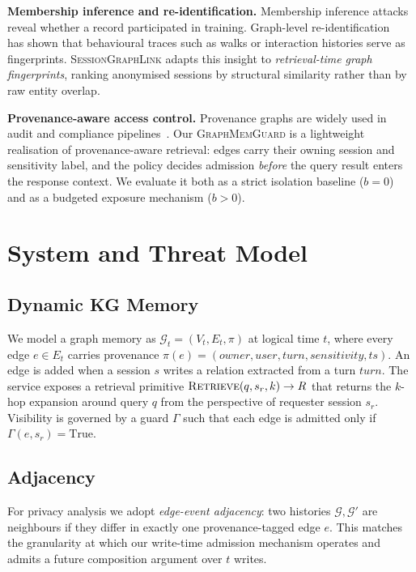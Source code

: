\documentclass[journal,10pt,twocolumn]{IEEEtran}
\begin{document}
\textbf{Membership inference and re-identification.} Membership
inference attacks~\cite{Shokri2017,Salem2019} reveal whether a record
participated in training. Graph-level
re-identification~\cite{Backes2017Walk2friends} has shown that
behavioural traces such as walks or interaction histories serve as
fingerprints. \textsc{SessionGraphLink} adapts this insight to
\emph{retrieval-time graph fingerprints}, ranking anonymised sessions
by structural similarity rather than by raw entity overlap.

\textbf{Provenance-aware access control.} Provenance graphs are widely
used in audit and compliance pipelines~\cite{Pasquier2017}. Our
\textsc{GraphMemGuard} is a lightweight realisation of
provenance-aware retrieval: edges carry their owning session and
sensitivity label, and the policy decides admission \emph{before} the
query result enters the response context. We evaluate it both as a
strict isolation baseline (\(b{=}0\)) and as a budgeted
exposure mechanism (\(b{>}0\)).

\section{System and Threat Model}
\label{sec:threat}

\subsection{Dynamic KG Memory}
We model a graph memory as
$\mathcal{G}_t = (V_t, E_t, \pi)$ at logical time $t$, where every
edge $e \in E_t$ carries provenance
$\pi(e) = (\textit{owner}, \textit{user}, \textit{turn},
\textit{sensitivity}, \textit{ts})$. An edge is added when a session
$s$ writes a relation extracted from a turn $\textit{turn}$. The
service exposes a retrieval primitive
$\textsc{Retrieve}(q, s_r, k) \rightarrow R$ that returns the
$k$-hop expansion around query $q$ from the perspective of requester
session $s_r$. Visibility is governed by a guard $\Gamma$ such that
each edge is admitted only if $\Gamma(e, s_r) = \mathrm{True}$.

\subsection{Adjacency}
For privacy analysis we adopt \emph{edge-event adjacency}: two
histories $\mathcal{G}, \mathcal{G}'$ are neighbours if they differ
in exactly one provenance-tagged edge $e$. This matches the
granularity at which our write-time admission mechanism operates and
admits a future composition argument over \(t\) writes.
\end{document}
